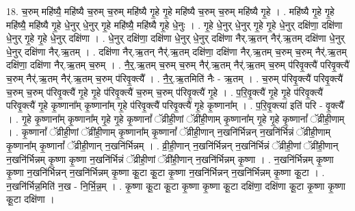 \documentclass[17pt]{extarticle}
\begin{document}
18. च॒रुम् महि॑ष्यै॒ महि॑ष्यै च॒रुम् च॒रुम् महि॑ष्यै गृ॒हे गृ॒हे महि॑ष्यै च॒रुम् च॒रुम् महि॑ष्यै गृ॒हे । . महि॑ष्यै गृ॒हे गृ॒हे महि॑ष्यै॒ महि॑ष्यै गृ॒हे धे॒नुर् धे॒नुर् गृ॒हे महि॑ष्यै॒ महि॑ष्यै गृ॒हे धे॒नुः । . गृ॒हे धे॒नुर् धे॒नुर् गृ॒हे गृ॒हे धे॒नुर् दक्षि॑णा॒ दक्षि॑णा धे॒नुर् गृ॒हे गृ॒हे धे॒नुर् दक्षि॑णा । . धे॒नुर् दक्षि॑णा॒ दक्षि॑णा धे॒नुर् धे॒नुर् दक्षि॑णा नैर्.ऋ॒तन् नैर्॑.ऋ॒तम् दक्षि॑णा धे॒नुर् धे॒नुर् दक्षि॑णा नैर्.ऋ॒तम् । . दक्षि॑णा नैर्.ऋ॒तन् नैर्॑.ऋ॒तम् दक्षि॑णा॒ दक्षि॑णा नैर्.ऋ॒तम् च॒रुम् च॒रुम् नैर्॑.ऋ॒तम् दक्षि॑णा॒ दक्षि॑णा नैर्.ऋ॒तम् च॒रुम् । . नै॒र्॒.ऋ॒तम् च॒रुम् च॒रुम् नैर्॑.ऋ॒तम् नैर्॑.ऋ॒तम् च॒रुम् प॑रिवृ॒क्त्यै॑ परिवृ॒क्त्यै॑ च॒रुम् नैर्॑.ऋ॒तम् नैर्॑.ऋ॒तम् च॒रुम् प॑रिवृ॒क्त्यै᳚ । . नै॒र्॒.ऋ॒तमिति॑ नैः - ऋ॒तम् । . च॒रुम् प॑रिवृ॒क्त्यै॑ परिवृ॒क्त्यै॑ च॒रुम् च॒रुम् प॑रिवृ॒क्त्यै॑ गृ॒हे गृ॒हे प॑रिवृ॒क्त्यै॑ च॒रुम् च॒रुम् प॑रिवृ॒क्त्यै॑ गृ॒हे । . प॒रि॒वृ॒क्त्यै॑ गृ॒हे गृ॒हे प॑रिवृ॒क्त्यै॑ परिवृ॒क्त्यै॑ गृ॒हे कृ॒ष्णाना᳚म् कृ॒ष्णाना᳚म् गृ॒हे प॑रिवृ॒क्त्यै॑ परिवृ॒क्त्यै॑ गृ॒हे कृ॒ष्णाना᳚म् । . प॒रि॒वृ॒क्त्या॑ इति॑ परि - वृ॒क्त्यै᳚ । . गृ॒हे कृ॒ष्णाना᳚म् कृ॒ष्णाना᳚म् गृ॒हे गृ॒हे कृ॒ष्णानां᳚ ॅव्रीही॒णां ॅव्री॑ही॒णाम् कृ॒ष्णाना᳚म् गृ॒हे गृ॒हे कृ॒ष्णानां᳚ ॅव्रीही॒णाम् । . कृ॒ष्णानां᳚ ॅव्रीही॒णां ॅव्री॑ही॒णाम् कृ॒ष्णाना᳚म् कृ॒ष्णानां᳚ ॅव्रीही॒णान् न॒खनि॑र्भिन्नन् न॒खनि॑र्भिन्नं ॅव्रीही॒णाम् कृ॒ष्णाना᳚म् कृ॒ष्णानां᳚ ॅव्रीही॒णान् न॒खनि॑र्भिन्नम् । . व्री॒ही॒णान् न॒खनि॑र्भिन्नन् न॒खनि॑र्भिन्नं ॅव्रीही॒णां ॅव्री॑ही॒णान् न॒खनि॑र्भिन्नम् कृ॒ष्णा कृ॒ष्णा न॒खनि॑र्भिन्नं ॅव्रीही॒णां ॅव्री॑ही॒णान् न॒खनि॑र्भिन्नम् कृ॒ष्णा । . न॒खनि॑र्भिन्नम् कृ॒ष्णा कृ॒ष्णा न॒खनि॑र्भिन्नन् न॒खनि॑र्भिन्नम् कृ॒ष्णा कू॒टा कू॒टा कृ॒ष्णा न॒खनि॑र्भिन्नन् न॒खनि॑र्भिन्नम् कृ॒ष्णा कू॒टा । . न॒खनि॑र्भिन्न॒मिति॑ न॒ख - नि॒र्भि॒न्न॒म् । . कृ॒ष्णा कू॒टा कू॒टा कृ॒ष्णा कृ॒ष्णा कू॒टा दक्षि॑णा॒ दक्षि॑णा कू॒टा कृ॒ष्णा कृ॒ष्णा कू॒टा दक्षि॑णा । \newline
\end{document}
